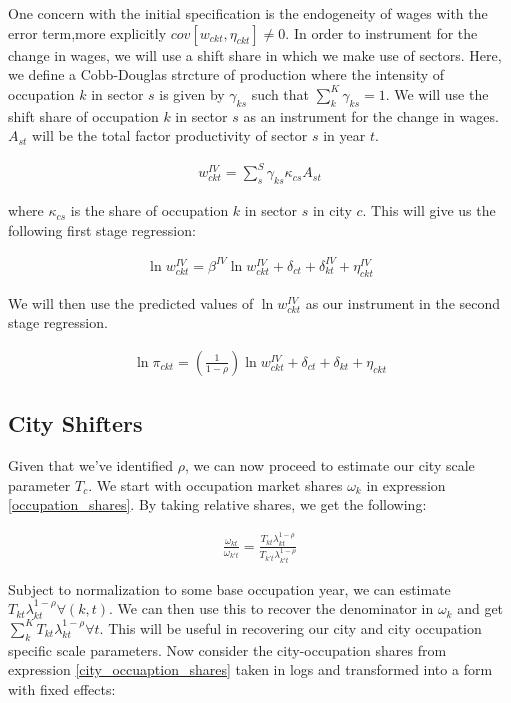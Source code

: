\documentclass[10pt]{article}
\begin{document}
One concern with the initial specification is the endogeneity of wages with the error term,more explicitly $cov[w_{ckt}, \eta_{ckt}] \neq 0$. In order to instrument for the change in wages, we will use a shift share in which we make use of sectors. Here, we define a Cobb-Douglas strcture of production where the intensity of occupation $k$ in sector $s$ is given by $\gamma_{ks}$ such that $\sum_{k}^{K} \gamma_{ks} = 1$. We will use the shift share of occupation $k$ in sector $s$ as an instrument for the change in wages. $A_{st}$ will be the total factor productivity of sector $s$ in year $t$.

\begin{align*}
    w_{ckt}^{IV} = \sum_{s}^{S} \gamma_{ks} \kappa_{cs} A_{st}
\end{align*}

where $\kappa_{cs}$ is the  share of occupation $k$ in sector $s$ in city $c$. This will give us the following first stage regression:

\begin{align*}
    \ln w_{ckt}^{IV} = \beta^{IV} \ln w_{ckt}^{IV} + \delta_{ct} + \delta_{kt}^{IV} + \eta_{ckt}^{IV}
\end{align*}

We will then use the predicted values of $\ln w_{ckt}^{IV}$ as our instrument in the second stage regression.

\begin{align*}
    \ln \pi_{ckt} = \left( \frac{1}{1 - \rho} \right) \ln w_{ckt}^{IV} + \delta_{ct} + \delta_{kt} + \eta_{ckt}
\end{align*}

\subsection{City Shifters}

Given that we've identified $\rho$, we can now proceed to estimate our city scale parameter $T_c$. We start with occupation market shares $\omega_k$ in expression \ref{occupation_shares}. By taking relative shares, we get the following:

\begin{align*}
    \frac{\omega_{kt}}{\omega_{k't}} = \frac{T_{kt} \lambda_{kt}^{1 - \rho}}{T_{k't} \lambda_{k't}^{1 - \rho}}
\end{align*}

Subject to normalization to some base occupation year, we can estimate $T_{kt} \lambda_{kt}^{1 - \rho} \forall (k, t)$. We can then use this to recover the denominator in $\omega_k$ and get $\sum_{k}^{K} T_{kt} \lambda_{kt}^{1 - \rho} \forall t$. This will be useful in recovering our city and city occupation specific scale parameters. Now consider the city-occupation shares from expression \ref{city_occuaption_shares} taken in logs and transformed into a form with fixed effects:
\end{document}
